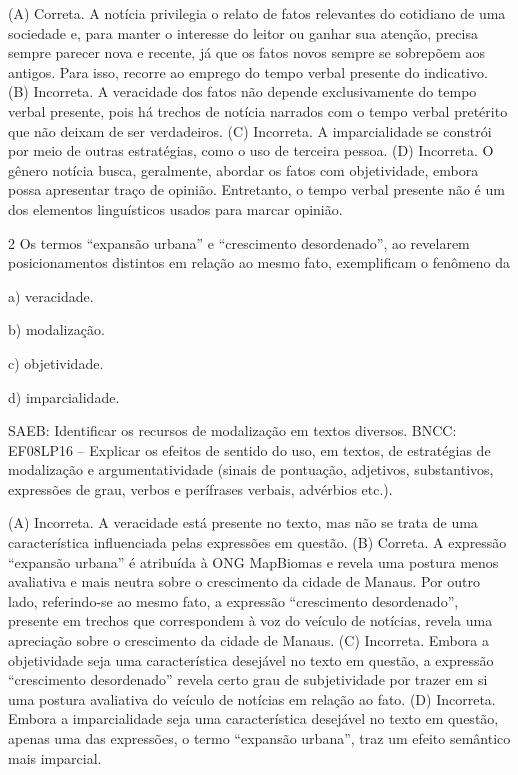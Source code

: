 (A) Correta. A notícia privilegia o relato de fatos relevantes do
cotidiano de uma sociedade e, para manter o interesse do leitor ou
ganhar sua atenção, precisa sempre parecer nova e recente, já que os
fatos novos sempre se sobrepõem aos antigos. Para isso, recorre ao
emprego do tempo verbal presente do indicativo. (B) Incorreta. A
veracidade dos fatos não depende exclusivamente do tempo verbal
presente, pois há trechos de notícia narrados com o tempo verbal
pretérito que não deixam de ser verdadeiros. (C) Incorreta. A
imparcialidade se constrói por meio de outras estratégias, como o uso de
terceira pessoa. (D) Incorreta. O gênero notícia busca, geralmente,
abordar os fatos com objetividade, embora possa apresentar traço de
opinião. Entretanto, o tempo verbal presente não é um dos elementos
linguísticos usados para marcar opinião.

\num{2} Os termos ``expansão urbana'' e ``crescimento desordenado'', ao
revelarem posicionamentos distintos em relação ao mesmo fato,
exemplificam o fenômeno da

a) veracidade.

b) modalização.

c) objetividade.

d) imparcialidade.

SAEB: Identificar os recursos de modalização em textos diversos. BNCC:
EF08LP16 -- Explicar os efeitos de sentido do uso, em textos, de
estratégias de modalização e argumentatividade (sinais de pontuação,
adjetivos, substantivos, expressões de grau, verbos e perífrases
verbais, advérbios etc.).

(A) Incorreta. A veracidade está presente no texto, mas não se trata de
uma característica influenciada pelas expressões em questão. (B)
Correta. A expressão ``expansão urbana'' é atribuída à ONG MapBiomas e
revela uma postura menos avaliativa e mais neutra sobre o crescimento da
cidade de Manaus. Por outro lado, referindo-se ao mesmo fato, a
expressão ``crescimento desordenado'', presente em trechos que
correspondem à voz do veículo de notícias, revela uma apreciação sobre o
crescimento da cidade de Manaus. (C) Incorreta. Embora a objetividade
seja uma característica desejável no texto em questão, a expressão
``crescimento desordenado'' revela certo grau de subjetividade por
trazer em si uma postura avaliativa do veículo de notícias em relação ao
fato. (D) Incorreta. Embora a imparcialidade seja uma característica
desejável no texto em questão, apenas uma das expressões, o termo
``expansão urbana'', traz um efeito semântico mais imparcial.

